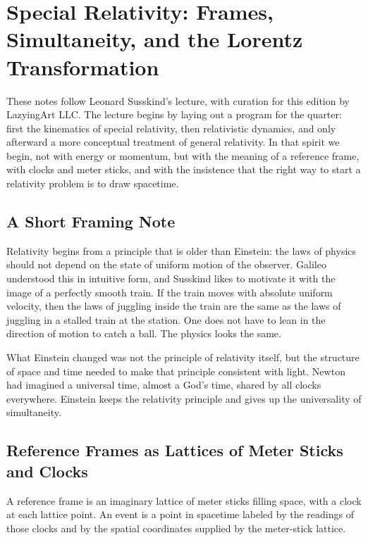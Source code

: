 \chapter{Special Relativity: Frames, Simultaneity, and the Lorentz Transformation}

These notes follow Leonard Susskind's lecture, with curation for this edition by LazyingArt LLC. The lecture begins by laying out a program for the quarter: first the kinematics of special relativity, then relativistic dynamics, and only afterward a more conceptual treatment of general relativity. In that spirit we begin, not with energy or momentum, but with the meaning of a reference frame, with clocks and meter sticks, and with the insistence that the right way to start a relativity problem is to draw spacetime.

\section{A Short Framing Note}

Relativity begins from a principle that is older than Einstein: the laws of physics should not depend on the state of uniform motion of the observer. Galileo understood this in intuitive form, and Susskind likes to motivate it with the image of a perfectly smooth train. If the train moves with absolute uniform velocity, then the laws of juggling inside the train are the same as the laws of juggling in a stalled train at the station. One does not have to lean in the direction of motion to catch a ball. The physics looks the same.

What Einstein changed was not the principle of relativity itself, but the structure of space and time needed to make that principle consistent with light. Newton had imagined a universal time, almost a God's time, shared by all clocks everywhere. Einstein keeps the relativity principle and gives up the universality of simultaneity.

\section{Reference Frames as Lattices of Meter Sticks and Clocks}

\begin{definition}
A reference frame is an imaginary lattice of meter sticks filling space, with a clock at each lattice point. An event is a point in spacetime labeled by the readings of those clocks and by the spatial coordinates supplied by the meter-stick lattice.
\end{definition}

